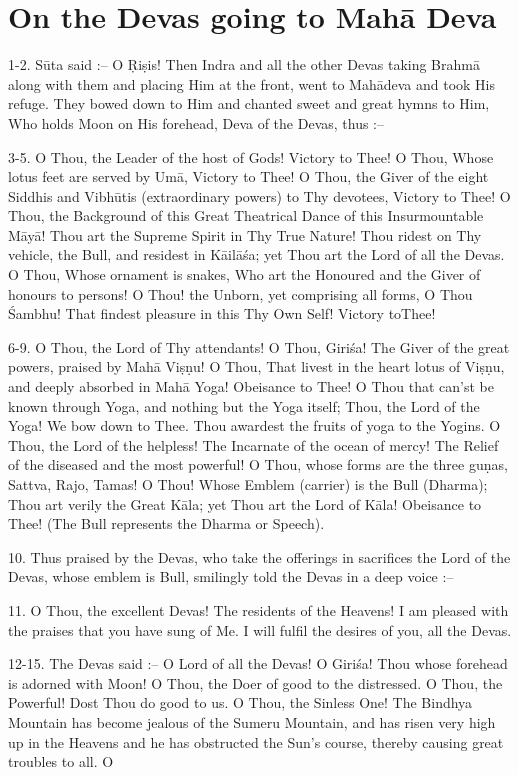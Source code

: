 \chapter{On the Devas going to Mah\=a Deva}

1-2. S\=uta said :-- O \d{R}i\d{s}is! Then Indra and all the other Devas taking Brahm\=a along with them and placing Him at the front, went to Mah\=adeva and took His refuge. They bowed down to Him and chanted sweet and great hymns to Him, Who holds Moon on His forehead, Deva of the Devas, thus :--

3-5. O Thou, the Leader of the host of Gods! Victory to Thee! O Thou, Whose lotus feet are served by Um\=a, Victory to Thee! O Thou, the Giver of the eight Siddhis and Vibh\=utis (extraordinary powers) to Thy devotees, Victory to Thee! O Thou, the Background of this Great Theatrical Dance of this Insurmountable M\=ay\=a! Thou art the Supreme Spirit in Thy True Nature! Thou ridest on Thy vehicle, the Bull, and residest in K\=ail\=a\'sa; yet Thou art the Lord of all the Devas. O Thou, Whose ornament is snakes, Who art the Honoured and the Giver of honours to persons! O Thou! the Unborn, yet comprising all forms, O Thou \'Sambhu! That findest pleasure in this Thy Own Self! Victory toThee!

6-9. O Thou, the Lord of Thy attendants! O Thou, Giri\'sa! The Giver of the great powers, praised by Mah\=a Vi\d{s}\d{n}u! O Thou, That livest in the heart lotus of Vi\d{s}\d{n}u, and deeply absorbed in Mah\=a Yoga! Obeisance to Thee! O Thou that can'st be known through Yoga, and nothing but the Yoga itself; Thou, the Lord of the Yoga! We bow down to Thee. Thou awardest the fruits of yoga to the Yogins. O Thou, the Lord of the helpless! The Incarnate of the ocean of mercy! The Relief of the diseased and the most powerful! O Thou, whose forms are the three gu\d{n}as, Sattva, Rajo, Tamas! O Thou! Whose Emblem (carrier) is the Bull (Dharma); Thou art verily the Great K\=ala; yet Thou art the Lord of K\=ala! Obeisance to Thee! (The Bull represents the Dharma or Speech).

10. Thus praised by the Devas, who take the offerings in sacrifices the Lord of the Devas, whose emblem is Bull, smilingly told the Devas in a deep voice :--

11. O Thou, the excellent Devas! The residents of the Heavens! I am pleased with the praises that you have sung of Me. I will fulfil the desires of you, all the Devas.

12-15. The Devas said :-- O Lord of all the Devas! O Giri\'sa! Thou whose forehead is adorned with Moon! O Thou, the Doer of good to the distressed. O Thou, the Powerful! Dost Thou do good to us. O Thou, the Sinless One! The Bindhya Mountain has become jealous of the Sumeru Mountain, and has risen very high up in the Heavens and he has obstructed the Sun's course, thereby causing great troubles to all. O

